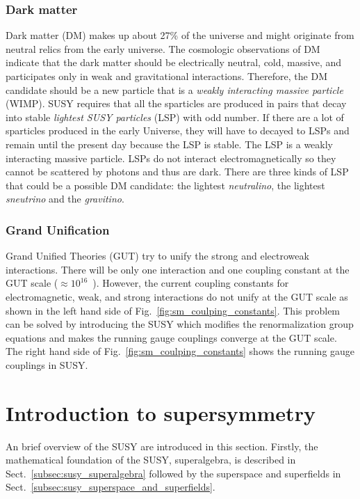 
\subsubsection{Dark matter}
\label{subsubsec:susy_dark_matter}
Dark matter (DM) makes up about 27\% of the universe and might originate from neutral relics from the early universe.
The cosmologic observations of DM indicate that the dark matter should be electrically neutral, cold, massive, and participates only in weak and gravitational interactions.
Therefore, the DM candidate should be a new particle that is a \textit{weakly interacting massive particle} (WIMP).
SUSY requires that all the sparticles are produced in pairs that decay into stable \textit{lightest SUSY particles} (LSP) with odd number.
If there are a lot of sparticles produced in the early Universe, they will have to decayed to LSPs and remain until the present day because the LSP is stable.
The LSP is a weakly interacting massive particle.
LSPs do not interact electromagnetically so they cannot be scattered by photons and thus are dark.
There are three kinds of LSP that could be a possible DM candidate: the lightest \textit{neutralino}, the lightest \textit{sneutrino} and the \textit{gravitino}.


\subsubsection{Grand Unification}
\label{subsubsec:susy_gut}
Grand Unified Theories (GUT) try to unify the strong and electroweak interactions.
There will be only one interaction and one coupling constant at the GUT scale ($\approx 10^{16}$~{\GeV}).
However, the current coupling constants for electromagnetic, weak, and strong interactions do not unify at the GUT scale as shown in the left hand side of Fig.~\ref{fig:sm_coulping_constants}.
This problem can be solved by introducing the SUSY which modifies the renormalization group equations and makes the running gauge couplings converge at the GUT scale.
The right hand side of Fig.~\ref{fig:sm_coulping_constants} shows the running gauge couplings in SUSY.


\section{Introduction to supersymmetry}
\label{sec:susy_intro}
An brief overview of the SUSY are introduced in this section.
Firstly, the mathematical foundation of the SUSY, superalgebra, is described in Sect.~\ref{subsec:susy_superalgebra} followed by the superspace and superfields in Sect.~\ref{subsec:susy_superspace_and_superfields}.

